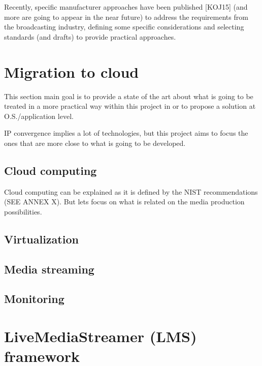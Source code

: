 Recently, specific manufacturer approaches have been published [KOJ15] (and more are going to
appear in the near future) to address the requirements from the broadcasting industry, defining some
specific considerations and selecting standards (and drafts) to provide practical approaches.


\section{Migration to cloud}

This section main goal is to provide a state of the art about what is going to be treated in a more practical way within this project in or to propose a solution at O.S./application level.

IP convergence implies a lot of technologies, but this project aims to focus the ones that are more close to what is going to be developed.

\subsection{Cloud computing}

Cloud computing can be explained as it is defined by the NIST recommendations (SEE ANNEX X). But lets focus on what is related on the media production possibilities.



\subsection{Virtualization}


\subsection{Media streaming}


\subsection{Monitoring}


\section{LiveMediaStreamer (LMS) framework}







